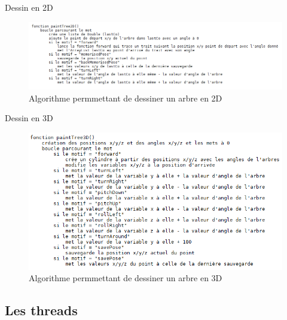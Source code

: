 \documentclass{beamer}
\begin{document}
\begin{frame}

	\begin{block}{Dessin en 2D}

	\begin{figure}[h]
	\includegraphics[scale=0.44]{images/paintTree2D.png}
	\caption{Algorithme permmettant de dessiner un arbre en 2D}
	\end{figure}

	\end{block}

\end{frame}
\begin{frame}

	\begin{block}{Dessin en 3D}

	\begin{figure}[h]
	\includegraphics[scale=0.44]{images/paintTree3D.png}
	\caption{Algorithme permmettant de dessiner un arbre en 3D}
	\end{figure}

	\end{block}


\end{frame}



\subsection{Les threads}
\end{document}
